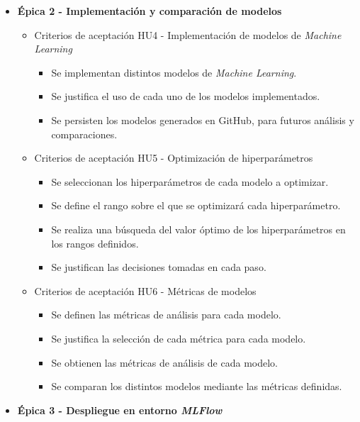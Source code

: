 \documentclass[
11pt, %
]{charter}
\begin{document}
\begin{itemize}
\begin{itemize}
\begin{itemize}
        \end{itemize}
    \end{itemize}
  \item \textbf{\'{E}pica 2 - Implementación y comparación de modelos}
    \begin{itemize}
      \item Criterios de aceptación HU4 - Implementación de modelos de \textit{Machine Learning}
        \begin{itemize}
            \item Se implementan distintos modelos de \textit{Machine Learning}.
            \item Se justifica el uso de cada uno de los modelos implementados.
            \item Se persisten los modelos generados en GitHub, para futuros análisis y comparaciones.
        \end{itemize}
      \item Criterios de aceptación HU5 - Optimización de hiperparámetros
        \begin{itemize}
            \item Se seleccionan los hiperparámetros de cada modelo a optimizar.
            \item Se define el rango sobre el que se optimizará cada hiperparámetro.
            \item Se realiza una búsqueda del valor óptimo de los hiperparámetros en los rangos definidos.
            \item Se justifican las decisiones tomadas en cada paso.
        \end{itemize}
\newpage
      \item Criterios de aceptación HU6 - Métricas de modelos
        \begin{itemize}
            \item Se definen las métricas de análisis para cada modelo.
            \item Se justifica la selección de cada métrica para cada modelo.
            \item Se obtienen las métricas de análisis de cada modelo.
            \item Se comparan los distintos modelos mediante las métricas definidas.
        \end{itemize}
    \end{itemize}
  \item \textbf{\'{E}pica 3 - Despliegue en entorno \textit{MLFlow}}
    \begin{itemize}

\end{itemize}
\end{itemize}
\end{document}
